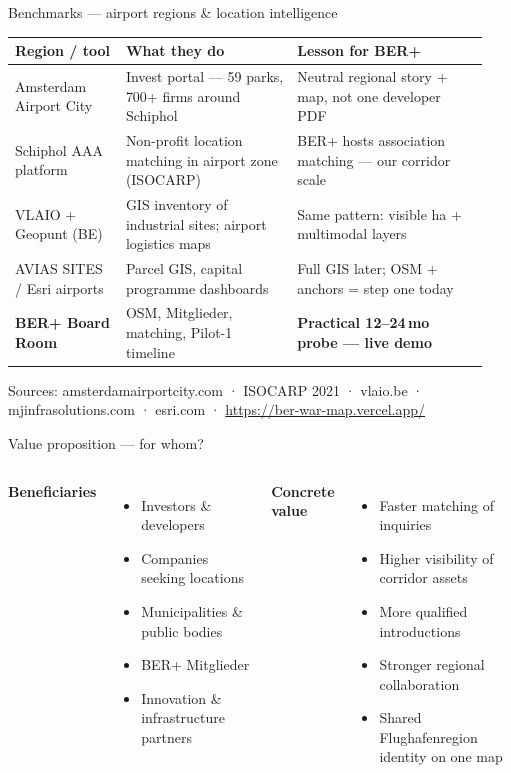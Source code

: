 \documentclass[aspectratio=169,11pt]{beamer}
\newcommand{\demourl}{\url{https://ber-war-map.vercel.app/}}
\begin{document}
\begin{frame}{Benchmarks --- airport regions \& location intelligence}
  \scriptsize
  \begin{table}
    \begin{tabular}{@{}p{0.22\linewidth}p{0.34\linewidth}p{0.38\linewidth}@{}}
      \toprule
      \textbf{Region / tool} & \textbf{What they do} & \textbf{Lesson for BER+} \\
      \midrule
      Amsterdam Airport City & Invest portal --- 59 parks, 700+ firms around Schiphol & Neutral regional story + map, not one developer PDF \\
      Schiphol AAA platform & Non-profit location matching in airport zone (ISOCARP) & BER+ hosts association matching --- our corridor scale \\
      VLAIO + Geopunt (BE) & GIS inventory of industrial sites; airport logistics maps & Same pattern: visible ha + multimodal layers \\
      AVIAS SITES / Esri airports & Parcel GIS, capital programme dashboards & Full GIS later; OSM + anchors = step one today \\
      \textbf{BER+ Board Room} & OSM, Mitglieder, matching, Pilot-1 timeline & \textbf{Practical 12--24\,mo probe --- live demo} \\
      \bottomrule
    \end{tabular}
  \end{table}
  \vspace{0.3em}
  \tiny Sources: amsterdamairportcity.com · ISOCARP 2021 · vlaio.be · mjinfrasolutions.com · esri.com · \demourl
\end{frame}

\begin{frame}{Value proposition --- for whom?}
  \begin{columns}[T]
    \textbf{Beneficiaries}
    \begin{itemize}
      \item Investors \& developers
      \item Companies seeking locations
      \item Municipalities \& public bodies
      \item BER+ Mitglieder
      \item Innovation \& infrastructure partners
    \end{itemize}
    \textbf{Concrete value}
    \begin{itemize}
      \item Faster matching of inquiries
      \item Higher visibility of corridor assets
      \item More qualified introductions
      \item Stronger regional collaboration
      \item Shared Flughafenregion identity on one map
    \end{itemize}
  \end{columns}
\end{frame}
\end{document}
